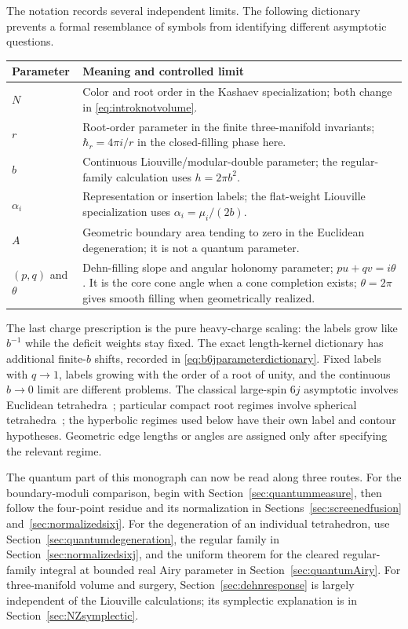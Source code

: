 The notation records several independent limits. The following
dictionary prevents a formal resemblance of symbols from
identifying different asymptotic questions.
\begin{center}
\small
\begin{tabular}{@{}>{\raggedright\arraybackslash}p{}>{\raggedright\arraybackslash}p{}@{}}
\toprule
Parameter & Meaning and controlled limit\\
\midrule
$N$ & Color and root order in the Kashaev specialization;
both change in \eqref{eq:introknotvolume}.\\[4pt]
$r$ & Root-order parameter in the finite three-manifold
invariants; $\hbar_r=4\pi i/r$ in the closed-filling phase here.\\[4pt]
$b$ & Continuous Liouville/modular-double parameter;
the regular-family calculation uses $h=2\pi b^2$.\\[4pt]
$\alpha_i$ & Representation or insertion labels; the flat-weight
Liouville specialization uses $\alpha_i=\mu_i/(2b)$.\\[4pt]
$A$ & Geometric boundary area tending to zero in the
Euclidean degeneration; it is not a quantum parameter.\\[4pt]
$(p,q)$ and $\theta$ & Dehn-filling slope and angular holonomy parameter;
$pu+qv=i\theta$. It is the core cone angle when a cone completion exists;
$\theta=2\pi$ gives smooth filling when geometrically realized.\\
\bottomrule
\end{tabular}
\end{center}
The last charge prescription is the pure heavy-charge scaling:
the labels grow like $b^{-1}$ while the deficit weights stay fixed.
The exact length-kernel dictionary has additional finite-$b$
shifts, recorded in \eqref{eq:b6jparameterdictionary}.
Fixed labels with $q\to1$, labels growing with the order of a root
of unity, and the continuous $b\to0$ limit are different problems.
The classical large-spin $6j$ asymptotic involves Euclidean
tetrahedra~\cite{Roberts}; particular compact root regimes involve
spherical tetrahedra~\cite{TaylorWoodward}; the hyperbolic regimes
used below have their own label and contour hypotheses. Geometric
edge lengths or angles are assigned only after specifying the
relevant regime.

The quantum part of this monograph can now be read along three routes.
For the boundary-moduli comparison, begin with
Section~\ref{sec:quantummeasure}, then follow the four-point residue
and its normalization in Sections~\ref{sec:screenedfusion}
and~\ref{sec:normalizedsixj}. For the degeneration of an individual
tetrahedron, use Section~\ref{sec:quantumdegeneration}, the regular
family in Section~\ref{sec:normalizedsixj}, and the uniform theorem for the cleared regular-family integral
at bounded real Airy parameter in Section~\ref{sec:quantumAiry}. For three-manifold volume
and surgery, Section~\ref{sec:dehnresponse} is largely independent
of the Liouville calculations; its symplectic explanation is in
Section~\ref{sec:NZsymplectic}.

